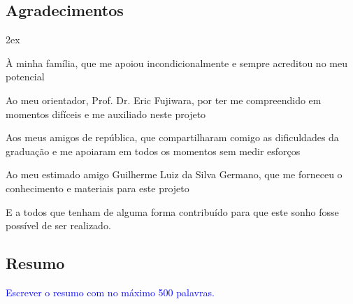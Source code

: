 \clearpage
\clearpage
\begin{center}
\chapter*{Agradecimentos}
\end{center}
\vspace*{1cm}
\begin{trivlist}  \itemsep 2ex  \normalsize

\item À minha família, que me apoiou incondicionalmente e sempre acreditou no meu potencial

\item Ao meu orientador, Prof. Dr. Eric Fujiwara, por ter me compreendido em momentos difíceis e me auxiliado neste projeto

\item Aos meus amigos de república, que compartilharam comigo as dificuldades da graduação e me apoiaram em todos os momentos sem medir esforços

\item Ao meu estimado amigo Guilherme Luiz da Silva Germano, que me forneceu o conhecimento e materiais para este projeto

\item E a todos que tenham de alguma forma contribuído para que este sonho fosse possível de ser realizado.

\end{trivlist}




\clearpage

\begin{center}
\chapter*{Resumo}
\end{center}
\vspace{24pt}
\onehalfspacing
\noindent
\textcolor{Blue}{Escrever o resumo com no máximo 500 palavras.}\\

